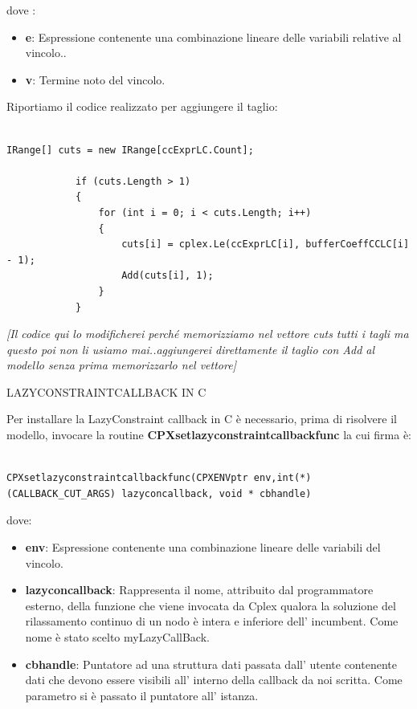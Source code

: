 \documentclass[11pt]{article}
\begin{document}
dove :

\begin{itemize}
	\item \textbf{e}: Espressione contenente una combinazione lineare delle variabili relative al vincolo..
	\item \textbf{v}: Termine noto del vincolo. 
\end{itemize}


Riportiamo il codice realizzato per aggiungere il taglio:


\begin{lstlisting}

IRange[] cuts = new IRange[ccExprLC.Count];

            if (cuts.Length > 1)
            {
                for (int i = 0; i < cuts.Length; i++)
                {
                    cuts[i] = cplex.Le(ccExprLC[i], bufferCoeffCCLC[i] - 1);
                    Add(cuts[i], 1);
                }
            }

\end{lstlisting}


\textit{[Il codice qui lo modificherei perché memorizziamo nel vettore cuts tutti i tagli ma questo poi non li usiamo mai..aggiungerei direttamente il taglio con Add al modello senza prima memorizzarlo nel vettore]}


\vspace{2\baselineskip}
LAZYCONSTRAINTCALLBACK IN C
\vspace{2\baselineskip}



Per installare la LazyConstraint callback in C è necessario, prima di risolvere il modello, invocare la routine \textbf{CPXsetlazyconstraintcallbackfunc} la cui firma è:

\begin{lstlisting}

CPXsetlazyconstraintcallbackfunc(CPXENVptr env,int(*)(CALLBACK_CUT_ARGS) lazyconcallback, void * cbhandle)

\end{lstlisting}



dove:

\begin{itemize}
	\item \textbf{env}: Espressione contenente una combinazione lineare delle variabili del vincolo.
	\item \textbf{lazyconcallback}: Rappresenta il nome, attribuito dal programmatore esterno, della funzione che viene invocata da Cplex qualora la soluzione del rilassamento continuo di un 										nodo è intera e inferiore dell' incumbent. Come nome è stato scelto myLazyCallBack.
	\item \textbf{cbhandle}: Puntatore ad una struttura dati passata dall' utente contenente dati che devono essere visibili all' interno della callback da noi scritta. Come parametro si è 								 passato il puntatore all' istanza. 
\end{itemize}
\end{document}
